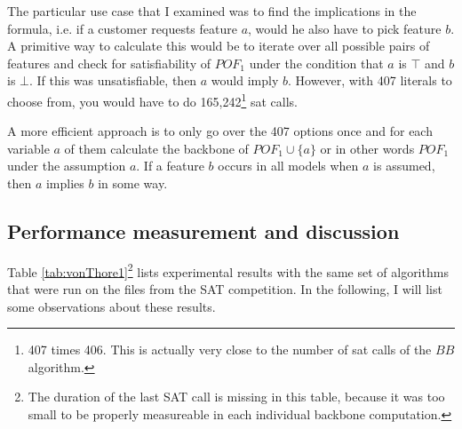 The particular use case that I examined was to find the implications in the formula, i.e. if a customer requests feature $a$, would he also have to pick feature $b$. A primitive way to calculate this would be to iterate over all possible pairs of features 
and check for satisfiability of $POF_1$ under the condition that $a$ is $\top$ and $b$ is $\bot$. If this was unsatisfiable, then $a$ would imply $b$. However, with 407 literals to choose from, you would have to do 165,242\footnote{407 times 406. This is actually very close to the number of sat calls of the $BB$ algorithm.} sat calls. 

A more efficient approach is to only go over the 407 options once and for each variable $a$ of them calculate the backbone of $POF_1 \cup \{a\}$ or in other words $POF_1$ under the assumption $a$. If a feature $b$ occurs in all models when $a$ is assumed, then $a$ implies $b$ in some way.


\subsection{Performance measurement and discussion}
Table \ref{tab:vonThore1}\footnote{The duration of the last SAT call is missing in this table, because it was too small to be properly measureable in each individual backbone computation.} lists experimental results with the same set of algorithms that were run on the files from the SAT competition. In the following, I will list some observations about these results.

